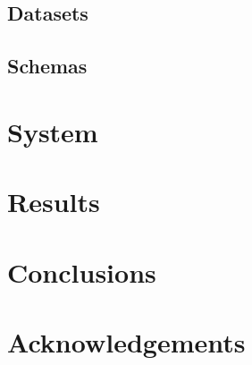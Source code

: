 \documentclass{sigkddExp}
\begin{document}
\subsection{Datasets}

\blindtext

\subsection{Schemas}

\blindtext

\section{System}
\blindtext

\section{Results}
\blindtext


\section{Conclusions}
\blindtext

\section{Acknowledgements}
\blindtext

\printbibliography

\end{document}
